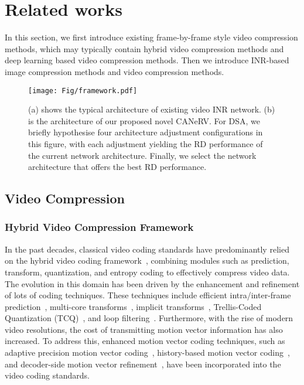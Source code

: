 \section{Related works}
{
In this section, we first introduce existing frame-by-frame style 
video compression methods, which may typically contain hybrid
video compression methods and deep learning based video compression methods. Then we introduce INR-based image compression methods and video compression methods.}

\begin{figure*}[!t]
    \centering
    \texttt{[image: Fig/framework.pdf]}
    \caption{(a) shows the typical architecture of existing video INR network. (b) is the architecture of our proposed novel CANeRV. {For DSA, we briefly hypothesise four architecture adjustment configurations in this figure, with each adjustment yielding the RD performance of the current network architecture. Finally, we select the network architecture that offers the best RD performance.}}
    \label{framework}
\end{figure*}

\subsection{Video Compression} 
\subsubsection{Hybrid Video Compression Framework}
In the past decades, classical video coding standards have predominantly relied on the hybrid video coding framework~\cite{DBLP:journals/tcsv/WiegandSBL03,DBLP:journals/tcsv/SullivanOHW12,bross2021overview}, combining modules such as prediction, transform, quantization, and entropy coding to effectively compress video data. The evolution in this domain has been driven by the enhancement and refinement of lots of coding techniques. These techniques include efficient intra/inter-frame prediction~\cite{cao2012short,DBLP:conf/icip/De-Luxan-Hernandez19,DBLP:journals/tcsv/GaoCECS21,zhang2018improved,DBLP:conf/icmcs/Fu00ZWM020,DBLP:journals/tip/ZhangCZCK19}, multi-core transforms~\cite{zhao2018joint}, implicit transforms~\cite{DBLP:conf/icmcs/ZhangZZL0WM020}, Trellis-Coded Quantization (TCQ)~\cite{DBLP:conf/dcc/SchwarzNMW19}, and loop filtering~\cite{DBLP:journals/jstsp/TsaiCYCHFIWCKL13,zhang2016low}. Furthermore, with the rise of modern video resolutions, the cost of transmitting motion vector information has also increased. To address this, enhanced motion vector coding techniques, such as adaptive precision motion vector coding~\cite{DBLP:conf/pcs/Liu00XWLH19}, history-based motion vector coding~\cite{DBLP:conf/icmcs/YinXZ0LF20}, and decoder-side motion vector refinement~\cite{DBLP:journals/tcsv/GaoCECS21}, have been incorporated into the video coding standards.

